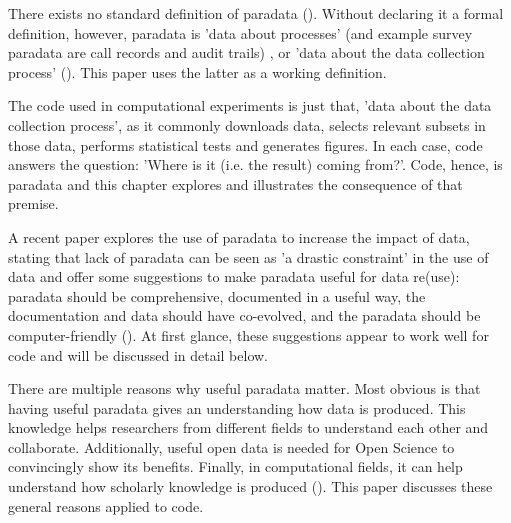 
There exists no standard definition of paradata (\cite{nicolaas2011survey,skold2022interrogating,huvila2022improving}).
Without declaring it a formal definition, however,
paradata is 'data about processes' (and example survey paradata 
are call records and audit trails) \cite{nicolaas2011survey},
or 'data about the data collection process' (\cite{choumert2019using}).
This paper uses the latter as a working definition.


The code used in computational experiments is just that, 
'data about the data collection 
process', as it commonly downloads data,
selects relevant subsets in those data,
performs statistical tests and generates figures.
In each case, code answers the question: 
'Where is it (i.e. the result) coming from?'.
Code, hence, is paradata and this chapter explores and illustrates the
consequence of that premise.


A recent paper explores the use of paradata to increase the impact of data,
stating that lack of paradata can be seen as 'a drastic constraint'
in the use of data and offer some suggestions to 
make paradata useful for data re(use):
paradata should be comprehensive, documented in a useful way, 
the documentation and data should have co-evolved, 
and the paradata should be computer-friendly (\cite{huvila2022improving}).
At first glance, these suggestions appear to work well for code
and will be discussed in detail below.


There are multiple reasons why useful paradata matter. 
Most obvious is that having useful paradata gives an understanding how
data is produced.
This knowledge helps researchers from different fields to understand each other
and collaborate.
Additionally, useful open data is needed for Open Science to convincingly show
its benefits.
Finally, in computational fields, 
it can help understand how scholarly knowledge is produced (\cite{huvila2022improving}).
This paper discusses these general reasons applied to code.

